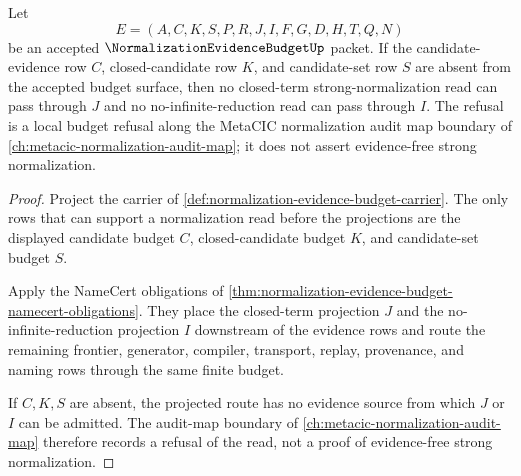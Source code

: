 \begin{theorem}
\label{thm:normalization-evidence-budget-refusal-route}
Let
$$
E=(A,C,K,S,P,R,J,I,F,G,D,H,T,Q,N)
$$
be an accepted $\NormalizationEvidenceBudgetUp$ packet. If the candidate-evidence row $C$, closed-candidate row $K$, and candidate-set row $S$ are absent from the accepted budget surface, then no closed-term strong-normalization read can pass through $J$ and no no-infinite-reduction read can pass through $I$. The refusal is a local budget refusal along the MetaCIC normalization audit map boundary of \autoref{ch:metacic-normalization-audit-map}; it does not assert evidence-free strong normalization.
\end{theorem}
\begin{proof}
Project the carrier of \autoref{def:normalization-evidence-budget-carrier}. The only rows that can support a normalization read before the projections are the displayed candidate budget $C$, closed-candidate budget $K$, and candidate-set budget $S$.

Apply the NameCert obligations of \autoref{thm:normalization-evidence-budget-namecert-obligations}. They place the closed-term projection $J$ and the no-infinite-reduction projection $I$ downstream of the evidence rows and route the remaining frontier, generator, compiler, transport, replay, provenance, and naming rows through the same finite budget.

If $C,K,S$ are absent, the projected route has no evidence source from which $J$ or $I$ can be admitted. The audit-map boundary of \autoref{ch:metacic-normalization-audit-map} therefore records a refusal of the read, not a proof of evidence-free strong normalization.
\end{proof}



